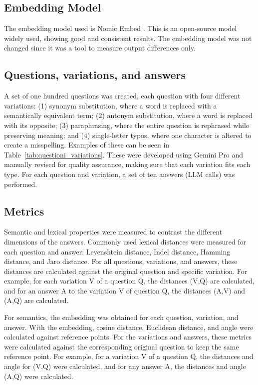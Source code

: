 \documentclass[a4paper,
               ]{jacow}
\begin{document}
\subsection{Embedding Model}
The embedding model used is Nomic Embed \cite{zach2024}. This is an open-source model widely used, showing good and consistent results. The embedding model was not changed since it was a tool to measure output differences only.

\subsection{Questions, variations, and answers}
A set of one hundred questions was created, each question with four different variations: (1) synonym substitution, where a word is replaced with a semantically equivalent term; (2) antonym substitution, where a word is replaced with its opposite; (3) paraphrasing, where the entire question is rephrased while preserving meaning; and (4) single-letter typos, where one character is altered to create a misspelling. Examples of these can be seen in Table~\ref{tab:questioni_variations}. These were developed using Gemini Pro and manually revised for quality assurance, making sure that each variation fits each type.
For each question and variation, a set of ten answers (LLM calls) was performed.

\subsection{Metrics}
Semantic and lexical properties were measured to contrast the different dimensions of the answers. Commonly used lexical distances were measured for each question and answer: Levenshtein distance, Indel distance, Hamming distance, and Jaro distance. For all questions, variations, and answers, these distances are calculated against the original question and specific variation. For example, for each variation V of a question Q, the distances (V,Q) are calculated, and for an answer A to the variation V of question Q, the distances (A,V) and (A,Q) are calculated.

For semantics, the embedding was obtained for each question, variation, and answer. With the embedding, cosine distance, Euclidean distance, and angle were calculated against reference points. For the variations and answers, these metrics were calculated against the corresponding original question to keep the same reference point. For example, for a variation V of a question Q, the distances and angle for (V,Q) were calculated, and for any answer A, the distances and angle (A,Q) were calculated.
\end{document}
